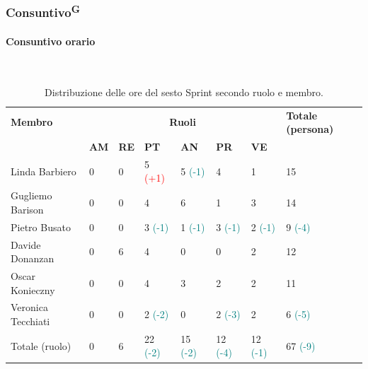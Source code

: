 \documentclass[8pt]{article}
\newcommand{\glossterm}[1]{#1\textsuperscript{G}} %
\newcommand{\subsubsubsection}[1]{\paragraph{#1}\mbox{}\\}
\begin{document}
\subsubsection{\glossterm{Consuntivo}}
\subsubsubsection{Consuntivo orario}
\begin{table}[ht!]
	\centering
	\begin{tabular}{p{4cm}*{6}{l}p{3cm}}
        \toprule
		\textbf{Membro} & \multicolumn{6}{c}{\textbf{Ruoli}} & \textbf{Totale
        (persona)}\\
		& \textbf{AM} & \textbf{RE} & \textbf{PT} & \textbf{AN} & \textbf{PR} & \textbf{VE}\\
		\midrule
        Linda Barbiero & 0 & 0 & 5 \textcolor{red}{(+1)} & 5 \textcolor{teal}{(-1)} & 4 & 1 & 15 \\ 
        Gugliemo Barison & 0 & 0 & 4 & 6 & 1 & 3 & 14 \\ 
        Pietro Busato & 0 & 0 & 3 \textcolor{teal}{(-1)} & 1 \textcolor{teal}{(-1)} & 3 \textcolor{teal}{(-1)} & 2 \textcolor{teal}{(-1)} & 9 \textcolor{teal}{(-4)} \\ 
        Davide Donanzan & 0 & 6 & 4 & 0 & 0 & 2 & 12 \\ 
        Oscar Konieczny & 0 & 0 & 4 & 3 & 2 & 2 & 11 \\ 
        Veronica Tecchiati & 0 & 0 & 2 \textcolor{teal}{(-2)} & 0 & 2 \textcolor{teal}{(-3)} & 2 & 6 \textcolor{teal}{(-5)} \\
        \midrule 
        Totale (ruolo) & 0 & 6 & 22 \textcolor{teal}{(-2)} & 15 \textcolor{teal}{(-2)} & 12 \textcolor{teal}{(-4)} & 12 \textcolor{teal}{(-1)} & 67 \textcolor{teal}{(-9)} \\ 
        \bottomrule
    \end{tabular}
	\caption{Distribuzione delle ore del sesto Sprint secondo ruolo e membro.}
	\label{table:Distribuzione delle ore del sesto Sprint secondo ruolo e membr}
\end{table}
\end{document}
